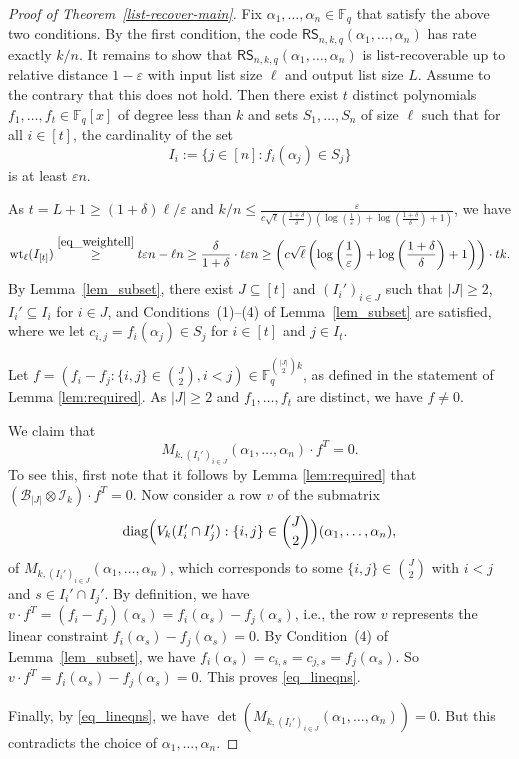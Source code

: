 \documentclass[11pt]{article}
\renewcommand{\epsilon}{\varepsilon}
\newcommand{\F}{{\mathbb{F}}}
\begin{document}
\begin{proof}[Proof of Theorem~\ref{list-recover-main}]
Fix $\alpha_1,\dots,\alpha_n\in\F_q$ that satisfy the above two conditions.
By the first condition, the code $\mathsf{RS}_{n,k,q}(\alpha_1,\dots,\alpha_n)$ has rate exactly $k/n$.
It remains to show that $\mathsf{RS}_{n,k,q}(\alpha_1,\dots,\alpha_n)$ is  list-recoverable up to relative distance $1-\epsilon$ with input list size $\ell$ and output list size $L$.
Assume to the contrary that this does not hold. Then there exist $t$ distinct polynomials $f_1,\dots,f_t\in \F_q[x]$ of degree less than $k$ and sets $S_1,\dots,S_n$ of size $\ell$ such that for all $i\in [t]$, the cardinality of the set
\[
I_i:=\{j\in [n]:  f_i(\alpha_j)\in S_j\}
\]
is at least $\epsilon n$.

As $t=L+1\geq (1+\delta) \ell/\epsilon$ and
$k/n\leq \frac{\epsilon}{c \sqrt{\ell}( \frac{1+\delta}{\delta } )(\log(\frac{1}{\epsilon})+\log( \frac{1+\delta}{\delta })+1)}$,
we have
\[
\mathrm{wt}_\ell(I_{[t]})\stackrel{\eqref{eq_weightell}}{\geq } t \epsilon n-\ell n \geq \frac{\delta}{1+\delta} \cdot t\epsilon n\geq  \left(c\sqrt{\ell}\left(\log\left(\frac{1}{\epsilon}\right)+\log\left( \frac{1+\delta}{\delta }\right)+1\right)\right)\cdot tk.
\]
By Lemma~\ref{lem_subset},  there exist $J\subseteq [t]$ and   $(I_i')_{i\in J}$
such that $|J|\geq 2$, $I_i'\subseteq I_i$ for $i\in J$,  and Conditions~(1)--(4) of Lemma~\ref{lem_subset} are satisfied, where we let $c_{i,j}=f_i(\alpha_j)\in S_j$ for $i\in [t]$ and $j\in I_t$.

Let $f=(f_i-f_j: \{i,j\}\in \binom{J}{2}, i<j)\in \F_q^{\binom{|J|}{2}k}$, as defined in the statement of Lemma \ref{lem:required}. As $|J|\geq 2$ and $f_1,\dots, f_t$ are distinct, we have $f\neq 0$.

We claim that
\begin{equation}\label{eq_lineqns}
M_{k, (I_i')_{i\in J}}(\alpha_1,\dots,\alpha_n) \cdot f^T=0.
\end{equation}
To see this, first note that it follows by Lemma \ref{lem:required} that $(\mathcal{B}_{|J|}\otimes \mathcal{I}_k)\cdot f^T=0$.
Now consider a row $v$ of the submatrix
\[
{\rm diag}\Big(V_k(I_i'\cap I_j'): \{i,j\}\in \binom{J}{2}\Big)(\alpha_1,\dots,\alpha_n),
\]
 of $M_{k, (I_i')_{i\in J}}(\alpha_1,\dots,\alpha_n)$, which corresponds to some $\{i,j\}\in \binom{J}{2}$ with $i<j$ and $s\in I_i'\cap I_j'$. By definition, we have $v \cdot f^T=(f_i-f_j)(\alpha_s)=f_i(\alpha_s)-f_j(\alpha_s)$, i.e., the row $v$ represents the linear constraint $f_i(\alpha_s)-f_j(\alpha_s)=0$.
By Condition~(4) of Lemma~\ref{lem_subset}, we have $f_i(\alpha_s)=c_{i,s}=c_{j,s}=f_j(\alpha_s)$.
So $v\cdot f^T=f_i(\alpha_s)-f_j(\alpha_s)=0$.
This proves \eqref{eq_lineqns}.

Finally, by \eqref{eq_lineqns}, we have $\det(M_{k, (I_i')_{i\in J}}(\alpha_1,\dots,\alpha_n))=0$. But this contradicts the choice of $\alpha_1,\dots,\alpha_n$.
\end{proof}
\end{document}
